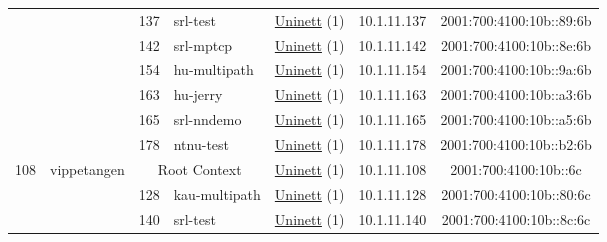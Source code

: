\begin{small}
\begin{center}
\begin{longtable}{|c|c|c|c|c|c|c|c|}
  &  & \tiny{137} & \multicolumn{1}{|l|}{\tiny{srl-test}} & \multicolumn{2}{|c|}{\tiny{\href{https://www.uninett.no}{Uninett} (1)}} & \tiny{10.1.11.137} & \tiny{2001:700:4100:10b::89:6b} \\* \cline{3-3}\cline{4-4}\cline{5-5}\cline{6-6}\cline{7-7}\cline{8-8}
  &  & \tiny{142} & \multicolumn{1}{|l|}{\tiny{srl-mptcp}} & \multicolumn{2}{|c|}{\tiny{\href{https://www.uninett.no}{Uninett} (1)}} & \tiny{10.1.11.142} & \tiny{2001:700:4100:10b::8e:6b} \\* \cline{3-3}\cline{4-4}\cline{5-5}\cline{6-6}\cline{7-7}\cline{8-8}
  &  & \tiny{154} & \multicolumn{1}{|l|}{\tiny{hu-multipath}} & \multicolumn{2}{|c|}{\tiny{\href{https://www.uninett.no}{Uninett} (1)}} & \tiny{10.1.11.154} & \tiny{2001:700:4100:10b::9a:6b} \\* \cline{3-3}\cline{4-4}\cline{5-5}\cline{6-6}\cline{7-7}\cline{8-8}
  &  & \tiny{163} & \multicolumn{1}{|l|}{\tiny{hu-jerry}} & \multicolumn{2}{|c|}{\tiny{\href{https://www.uninett.no}{Uninett} (1)}} & \tiny{10.1.11.163} & \tiny{2001:700:4100:10b::a3:6b} \\* \cline{3-3}\cline{4-4}\cline{5-5}\cline{6-6}\cline{7-7}\cline{8-8}
  &  & \tiny{165} & \multicolumn{1}{|l|}{\tiny{srl-nndemo}} & \multicolumn{2}{|c|}{\tiny{\href{https://www.uninett.no}{Uninett} (1)}} & \tiny{10.1.11.165} & \tiny{2001:700:4100:10b::a5:6b} \\* \cline{3-3}\cline{4-4}\cline{5-5}\cline{6-6}\cline{7-7}\cline{8-8}
  &  & \tiny{178} & \multicolumn{1}{|l|}{\tiny{ntnu-test}} & \multicolumn{2}{|c|}{\tiny{\href{https://www.uninett.no}{Uninett} (1)}} & \tiny{10.1.11.178} & \tiny{2001:700:4100:10b::b2:6b} \\ \hline
 \multirow{7}{*}{\tiny{108}} & \multicolumn{1}{|l|}{\multirow{7}{*}{\tiny{vippetangen}}} & \multicolumn{2}{|c|}{\tiny{Root Context}} & \multicolumn{2}{|c|}{\tiny{\href{https://www.uninett.no}{Uninett} (1)}} & \tiny{10.1.11.108} & \tiny{2001:700:4100:10b::6c} \\* \cline{3-3}\cline{4-4}\cline{5-5}\cline{6-6}\cline{7-7}\cline{8-8}
  &  & \tiny{128} & \multicolumn{1}{|l|}{\tiny{kau-multipath}} & \multicolumn{2}{|c|}{\tiny{\href{https://www.uninett.no}{Uninett} (1)}} & \tiny{10.1.11.128} & \tiny{2001:700:4100:10b::80:6c} \\* \cline{3-3}\cline{4-4}\cline{5-5}\cline{6-6}\cline{7-7}\cline{8-8}
  &  & \tiny{140} & \multicolumn{1}{|l|}{\tiny{srl-test}} & \multicolumn{2}{|c|}{\tiny{\href{https://www.uninett.no}{Uninett} (1)}} & \tiny{10.1.11.140} & \tiny{2001:700:4100:10b::8c:6c} \\* \cline{3-3}\cline{4-4}\cline{5-5}\cline{6-6}\cline{7-7}\cline{8-8}

\end{longtable}
\end{center}
\end{small}
